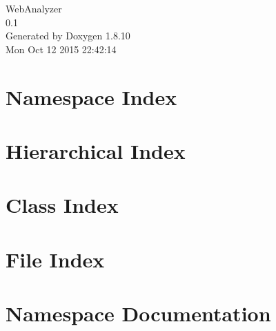 \documentclass[twoside]{book}
\newcommand{\+}{\discretionary{\mbox{\scriptsize$\hookleftarrow$}}{}{}}
\newcommand{\clearemptydoublepage}{%
  \newpage{\pagestyle{empty}\cleardoublepage}%
}
\begin{document}
\hypersetup{pageanchor=false,
             bookmarks=true,
             bookmarksnumbered=true,
             pdfencoding=unicode
            }
\begin{titlepage}
\vspace*{7cm}
\begin{center}%
{\Large Web\+Analyzer \\[1ex]\large 0.\+1 }\\
\vspace*{1cm}
{\large Generated by Doxygen 1.8.10}\\
\vspace*{0.5cm}
{\small Mon Oct 12 2015 22:42:14}\\
\end{center}
\end{titlepage}
\clearemptydoublepage
\tableofcontents
\clearemptydoublepage
{}
\hypersetup{pageanchor=true}

\chapter{Namespace Index}

\chapter{Hierarchical Index}

\chapter{Class Index}

\chapter{File Index}

\chapter{Namespace Documentation}
























\end{document}
